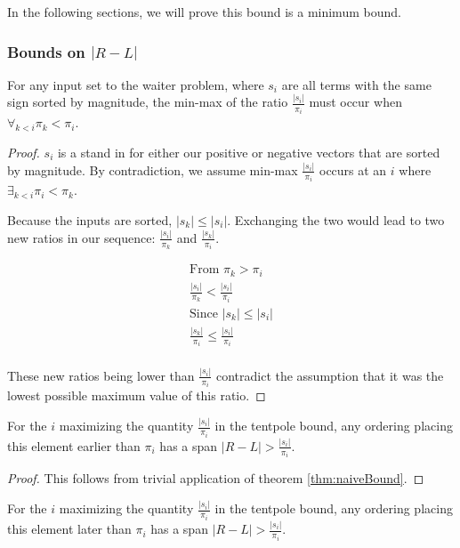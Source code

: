 \documentclass[11pt,twocolumn]{article}
\begin{document}
In the following sections, we will prove this bound is a minimum bound.

\subsubsection{Bounds on $|R - L|$}

\begin{lem} \label{lem:increasingOrder} 
For any input set to the waiter problem, where $s_i$ are all terms with the same sign sorted by magnitude, the min-max of the ratio $\frac{|s_i|}{\pi_i}$ must occur when $\forall_{k<i} \pi_k < \pi_i$.  
\end{lem}

\begin{proof}
$s_i$ is a stand in for either our positive or negative vectors that are sorted by magnitude. By contradiction, we assume min-max $\frac{|s_i|}{\pi_i}$ occurs at an $i$ where $\exists_{k<i} \pi_i < \pi_k$.  

Because the inputs are sorted, $|s_k| \leq |s_i|$.  Exchanging the two would lead to two new ratios in our sequence: $\frac{|s_i|}{\pi_k}$ and $\frac{|s_k|}{\pi_i}$.

\begin{eqnarray*}
\textrm{From } \pi_k > \pi_i \\
\frac{|s_i|}{\pi_k} < \frac{|s_i|}{\pi_i} \\
\textrm{Since } |s_k| \leq |s_i| \\
\frac{|s_k|}{\pi_i} \leq \frac{|s_i|}{\pi_i} \\
\end{eqnarray*}

These new ratios being lower than $\frac{|s_i|}{\pi_i}$ contradict the assumption that it was the lowest possible maximum value of this ratio.
\end{proof}

\begin{lem} \label{lem:tentBeforeBad}
For the $i$ maximizing the quantity $\frac{|s_i|}{\pi_i}$ in the tentpole bound, any ordering placing this element earlier than $\pi_i$ has a span $|R-L| > \frac{|s_i|}{\pi_i}$.
\end{lem}

\begin{proof}
This follows from trivial application of theorem \ref{thm:naiveBound}.
\end{proof}

\begin{lem} \label{lem:tentAfterBad}
For the $i$ maximizing the quantity $\frac{|s_i|}{\pi_i}$ in the tentpole bound, any ordering placing this element later than $\pi_i$  has a span $|R-L| > \frac{|s_i|}{\pi_i}$.
\end{lem}
\end{document}
